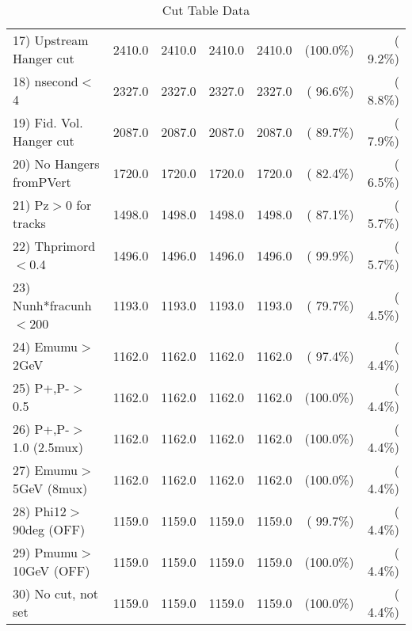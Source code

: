 \begin{table}[h!]
\begin{tabular}{||l||r|r|r|r|r|r||}
 17) Upstream Hanger cut  &       2410.0 &       2410.0 &       2410.0 &       2410.0 & (100.0\%) & (  9.2\%) \\
 18) nsecond$<$4          &       2327.0 &       2327.0 &       2327.0 &       2327.0 & ( 96.6\%) & (  8.8\%) \\
 19) Fid. Vol. Hanger cut &       2087.0 &       2087.0 &       2087.0 &       2087.0 & ( 89.7\%) & (  7.9\%) \\
 20) No Hangers fromPVert &       1720.0 &       1720.0 &       1720.0 &       1720.0 & ( 82.4\%) & (  6.5\%) \\
 21) Pz$>$0 for tracks    &       1498.0 &       1498.0 &       1498.0 &       1498.0 & ( 87.1\%) & (  5.7\%) \\
 22) Thprimord$<$0.4      &       1496.0 &       1496.0 &       1496.0 &       1496.0 & ( 99.9\%) & (  5.7\%) \\
 23) Nunh*fracunh$<$200   &       1193.0 &       1193.0 &       1193.0 &       1193.0 & ( 79.7\%) & (  4.5\%) \\
 24) Emumu$>$2GeV         &       1162.0 &       1162.0 &       1162.0 &       1162.0 & ( 97.4\%) & (  4.4\%) \\
 25) P+,P-$>$0.5          &       1162.0 &       1162.0 &       1162.0 &       1162.0 & (100.0\%) & (  4.4\%) \\
 26) P+,P-$>$1.0 (2.5mux) &       1162.0 &       1162.0 &       1162.0 &       1162.0 & (100.0\%) & (  4.4\%) \\
 27) Emumu$>$5GeV  (8mux) &       1162.0 &       1162.0 &       1162.0 &       1162.0 & (100.0\%) & (  4.4\%) \\
 28) Phi12$>$90deg  (OFF) &       1159.0 &       1159.0 &       1159.0 &       1159.0 & ( 99.7\%) & (  4.4\%) \\
 29) Pmumu$>$10GeV  (OFF) &       1159.0 &       1159.0 &       1159.0 &       1159.0 & (100.0\%) & (  4.4\%) \\
 30) No cut, not set      &       1159.0 &       1159.0 &       1159.0 &       1159.0 & (100.0\%) & (  4.4\%) \\
 \hline
 \hline
 \end{tabular}
 \caption{Cut Table  Data     }
 \label{tab-cutcohjpsi-mumu_data}
 \end{table}
